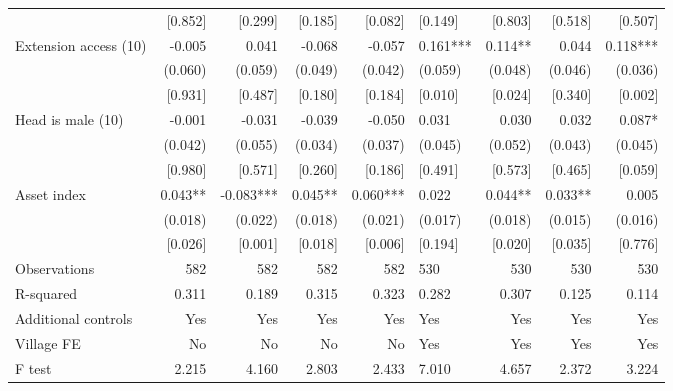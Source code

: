 \documentclass[
]{article}
\begin{document}
\begin{landscape}
\begin{ThreePartTable}
\begin{longtable}[t]{lrrrrlrrr}
 & {}[0.852] & {}[0.299] & {}[0.185] & {}[0.082] & {}[0.149] & {}[0.803] & {}[0.518] & {}[0.507]\\
Extension access (1\/0) & -0.005 & 0.041 & -0.068 & -0.057 & 0.161*** & 0.114** & 0.044 & 0.118***\\
 & (0.060) & (0.059) & (0.049) & (0.042) & (0.059) & (0.048) & (0.046) & (0.036)\\
 & {}[0.931] & {}[0.487] & {}[0.180] & {}[0.184] & {}[0.010] & {}[0.024] & {}[0.340] & {}[0.002]\\
Head is male (1\/0) & -0.001 & -0.031 & -0.039 & -0.050 & 0.031 & 0.030 & 0.032 & 0.087*\\
 & (0.042) & (0.055) & (0.034) & (0.037) & (0.045) & (0.052) & (0.043) & (0.045)\\
 & {}[0.980] & {}[0.571] & {}[0.260] & {}[0.186] & {}[0.491] & {}[0.573] & {}[0.465] & {}[0.059]\\
Asset index & 0.043** & -0.083*** & 0.045** & 0.060*** & 0.022 & 0.044** & 0.033** & 0.005\\
 & (0.018) & (0.022) & (0.018) & (0.021) & (0.017) & (0.018) & (0.015) & (0.016)\\
 & {}[0.026] & {}[0.001] & {}[0.018] & {}[0.006] & {}[0.194] & {}[0.020] & {}[0.035] & {}[0.776]\\
Observations & 582 & 582 & 582 & 582 & 530 & 530 & 530 & 530\\
R-squared & 0.311 & 0.189 & 0.315 & 0.323 & 0.282 & 0.307 & 0.125 & 0.114\\
Additional controls & Yes & Yes & Yes & Yes & Yes & Yes & Yes & Yes\\
Village FE & No & No & No & No & Yes & Yes & Yes & Yes\\
F test & 2.215 & 4.160 & 2.803 & 2.433 & 7.010 & 4.657 & 2.372 & 3.224\\*
\end{longtable}
\end{ThreePartTable}
\endgroup{}
\end{landscape}

\newpage
\end{document}
